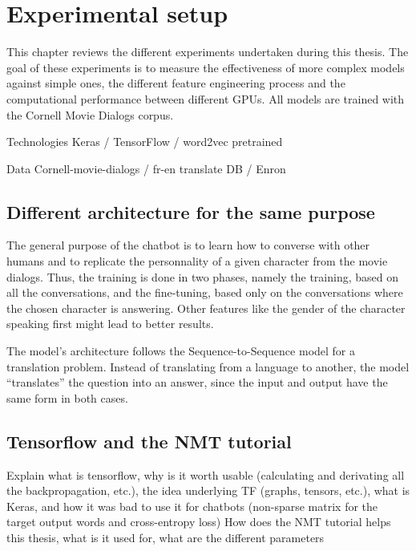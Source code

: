 
\chapter{Experimental setup} %

\label{Chapter3} %

This chapter reviews the different experiments undertaken during this thesis. The goal of these experiments is to measure the effectiveness of more complex models against simple ones, the different feature engineering process and the computational performance between different GPUs. All models are trained with the Cornell Movie Dialogs corpus.

Technologies
Keras / TensorFlow / word2vec pretrained

Data
Cornell-movie-dialogs / fr-en translate DB / Enron

\section{Different architecture for the same purpose}
The general purpose of the chatbot is to learn how to converse with other humans and to replicate the personnality of a given character from the movie dialogs. Thus, the training is done in two phases, namely the training, based on all the conversations, and the fine-tuning, based only on the conversations where the chosen character is answering. Other features like the gender of the character speaking first might lead to better results.

The model's architecture follows the Sequence-to-Sequence model for a translation problem. Instead of translating from a language to another, the model ``translates'' the question into an answer, since the input and output have the same form in both cases.

\section{Tensorflow and the NMT tutorial}
Explain what is tensorflow, why is it worth usable (calculating and derivating all the backpropagation, etc.), the idea underlying TF (graphs, tensors, etc.), what is Keras, and how it was bad to use it for chatbots (non-sparse matrix for the target output words and cross-entropy loss)
How does the NMT tutorial helps this thesis, what is it used for, what are the different parameters

